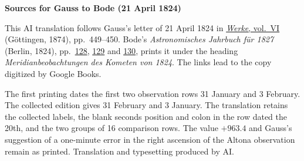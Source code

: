 \clearpage\thispagestyle{empty}
\begin{center}\textbf{Sources for Gauss to Bode (21 April 1824)}\end{center}
\noindent This AI translation follows Gauss’s letter of 21 April 1824 in \href{https://gdz.sub.uni-goettingen.de/id/PPN236007467}{\textit{Werke}, vol.~VI} (Göttingen, 1874), pp.~449--450. Bode’s \textit{Astronomisches Jahrbuch für 1827} (Berlin, 1824), pp.~\href{https://books.google.nl/books?id=4C8PAAAAQAAJ&pg=PA128&redir_esc=y}{128}, \href{https://books.google.nl/books?id=4C8PAAAAQAAJ&pg=PA129&redir_esc=y}{129} and \href{https://books.google.nl/books?id=4C8PAAAAQAAJ&pg=PA130&redir_esc=y}{130}, prints it under the heading \textit{Meridianbeobachtungen des Kometen von 1824}. The links lead to the copy digitized by Google Books.
\par\smallskip\noindent The first printing dates the first two observation rows 31 January and 3 February. The collected edition gives 31 February and 3 January. The translation retains the collected labels, the blank seconds position and colon in the row dated the 20th, and the two groups of 16 comparison rows. The value $+963.4$ and Gauss’s suggestion of a one-minute error in the right ascension of the Altona observation remain as printed. Translation and typesetting produced by AI.
\clearpage
